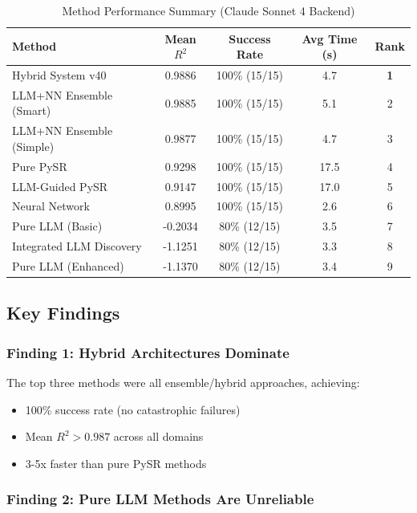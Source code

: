 \documentclass[11pt,a4paper]{article}
\begin{document}
\begin{table}[h]
\centering
\caption{Method Performance Summary (Claude Sonnet 4 Backend)}
\small
\begin{tabular}{lcccc}
\toprule
\textbf{Method} & \textbf{Mean $R^2$} & \textbf{Success Rate} & \textbf{Avg Time (s)} & \textbf{Rank} \\
\midrule
Hybrid System v40 & 0.9886 & 100\% (15/15) & 4.7 & \textbf{1} \\
LLM+NN Ensemble (Smart) & 0.9885 & 100\% (15/15) & 5.1 & 2 \\
LLM+NN Ensemble (Simple) & 0.9877 & 100\% (15/15) & 4.7 & 3 \\
Pure PySR & 0.9298 & 100\% (15/15) & 17.5 & 4 \\
LLM-Guided PySR & 0.9147 & 100\% (15/15) & 17.0 & 5 \\
Neural Network & 0.8995 & 100\% (15/15) & 2.6 & 6 \\
\midrule
Pure LLM (Basic) & -0.2034 & 80\% (12/15) & 3.5 & 7 \\
Integrated LLM Discovery & -1.1251 & 80\% (12/15) & 3.3 & 8 \\
Pure LLM (Enhanced) & -1.1370 & 80\% (12/15) & 3.4 & 9 \\
\bottomrule
\end{tabular}
\end{table}

\subsection{Key Findings}

\subsubsection{Finding 1: Hybrid Architectures Dominate}

The top three methods were all ensemble/hybrid approaches, achieving:
\begin{itemize}
    \item 100\% success rate (no catastrophic failures)
    \item Mean $R^2 > 0.987$ across all domains
    \item 3-5x faster than pure PySR methods
\end{itemize}

\subsubsection{Finding 2: Pure LLM Methods Are Unreliable}
\end{document}
